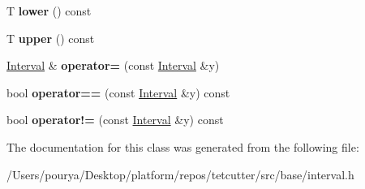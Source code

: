 \begin{DoxyCompactItemize}
\item 
\hypertarget{classps_1_1base_1_1Interval_a935d8456e4ab9578000b2a51a65b88b9}{}T {\bfseries lower} () const \label{classps_1_1base_1_1Interval_a935d8456e4ab9578000b2a51a65b88b9}

\item 
\hypertarget{classps_1_1base_1_1Interval_a4ad701eb95854f92850cd45313a16ac5}{}T {\bfseries upper} () const \label{classps_1_1base_1_1Interval_a4ad701eb95854f92850cd45313a16ac5}

\item 
\hypertarget{classps_1_1base_1_1Interval_a6cf3d678ead91b38dd97a396bf3f39c4}{}\hyperlink{classps_1_1base_1_1Interval}{Interval} \& {\bfseries operator=} (const \hyperlink{classps_1_1base_1_1Interval}{Interval} \&y)\label{classps_1_1base_1_1Interval_a6cf3d678ead91b38dd97a396bf3f39c4}

\item 
\hypertarget{classps_1_1base_1_1Interval_ac2da20194f151d4800ee344efa88178b}{}bool {\bfseries operator==} (const \hyperlink{classps_1_1base_1_1Interval}{Interval} \&y) const \label{classps_1_1base_1_1Interval_ac2da20194f151d4800ee344efa88178b}

\item 
\hypertarget{classps_1_1base_1_1Interval_ad5c4e5c798cfdcb97f3ff7cfdc13ee99}{}bool {\bfseries operator!=} (const \hyperlink{classps_1_1base_1_1Interval}{Interval} \&y) const \label{classps_1_1base_1_1Interval_ad5c4e5c798cfdcb97f3ff7cfdc13ee99}

\end{DoxyCompactItemize}


The documentation for this class was generated from the following file\+:\begin{DoxyCompactItemize}
\item 
/\+Users/pourya/\+Desktop/platform/repos/tetcutter/src/base/interval.\+h\end{DoxyCompactItemize}
